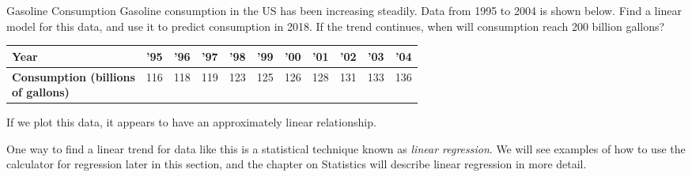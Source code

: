 \begin{example}[https://www.youtube.com/watch?v=QoOdfeLBN0o&list=PLfmpjsIzhztutjEb8Pg5OBOlI1p80yVoy&index=2]{Gasoline Consumption}
Gasoline consumption in the US has been increasing steadily.  Data from 1995 to 2004 is shown below.  Find a linear model for this data, and use it to predict consumption in 2018.  If the trend continues, when will consumption reach 200 billion gallons?

\solline
{}
\begin{center}
\begin{tabular}{|p{1in} | c | c | c | c | c | c | c | c | c | c|}
\hline
\textbf{Year} & '95 & '96 & '97 & '98 & '99 & '00 & '01 & '02 & '03 & '04\\
\hline
\parbox{0.9in}{\textbf{Consumption (billions}\\ \textbf{of gallons)}} & 116 & 118 & 119 & 123 & 125 & 126 & 128 & 131 & 133 & 136\\
\hline
\end{tabular}
\end{center}

If we plot this data, it appears to have an approximately linear relationship.
\begin{center}
\end{center}

One way to find a linear trend for data like this is a statistical technique known as \textit{linear regression}.  We will see examples of how to use the calculator for regression later in this section, and the chapter on Statistics will describe linear regression in more detail.


\end{example}
